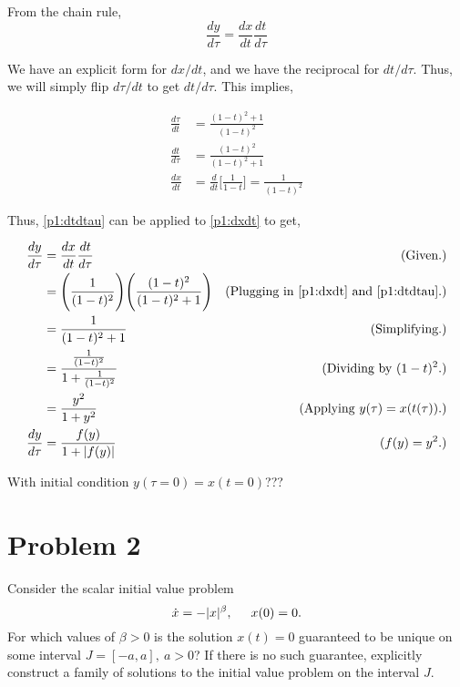 \begin{solution}
    From the chain rule,
    \[\frac{dy}{d\tau} = \frac{dx}{dt}\frac{dt}{d\tau}\]

    We have an explicit form for $dx/dt$, and we have the reciprocal for $dt/d\tau$. Thus, we will simply flip $d\tau/dt$ to get $dt/d\tau$. This implies,

    \alignbreak
    \begin{align}
        \frac{d\tau}{dt} &= \frac{(1 - t)^2 + 1}{(1 - t)^2} \nonumber\\
        \frac{dt}{d\tau} &= \frac{(1 - t)^2}{(1 - t)^2 + 1} \label{p1:dtdtau}\\  
        \frac{dx}{dt} &= \frac{d}{dt}\Bigg[ \frac{1}{1 - t}\Bigg] = \frac{1}{(1 - t)^2} \label{p1:dxdt}
    \end{align}
    \alignbreak

    Thus, \ref{p1:dtdtau} can be applied to \ref{p1:dxdt} to get, 

    \alignbreak
    \begin{align}
        \frac{dy}{d\tau} &= \frac{dx}{dt}\frac{dt}{d\tau} &\text{(Given.)}\nonumber\\
        &= \Bigg(\frac{1}{(1 - t)^2}\Bigg)\Bigg( \frac{(1 - t)^2}{(1 - t)^2 + 1}\Bigg) &\text{(Plugging in \ref{p1:dxdt} and \ref{p1:dtdtau}.)}\nonumber\\
        &= \frac{1}{(1 - t)^2 + 1} &\text{(Simplifying.)}\nonumber\\
        &= \frac{\frac{1}{(1 - t)^2}}{1 + \frac{1}{(1 - t)^2}} &\text{(Dividing by $(1 - t)^2$.)}\nonumber\\
        &= \frac{y^2}{1 + y^2} &\text{(Applying $y(\tau) = x(t(\tau))$.)}\nonumber\\
        \frac{dy}{d\tau} &= \frac{f(y)}{1 + |f(y)|} &\text{($f(y) = y^2$.)}\nonumber
    \end{align}
    \alignbreak

    With initial condition $y(\tau = 0) = x(t = 0)$???
\end{solution}%

\newpage

\section{Problem 2}
Consider the scalar initial value problem
\[
\dot{x} = -|x|^\beta, \hspace{5mm} x(0) = 0.
\]
For which values of $\beta > 0$ is the solution $x(t) = 0$ guaranteed to be unique on some interval $J = [-a, a], \ a > 0$? If there is no such guarantee, explicitly construct a family of solutions to the initial value problem on the interval $J$.   
\partbreak

